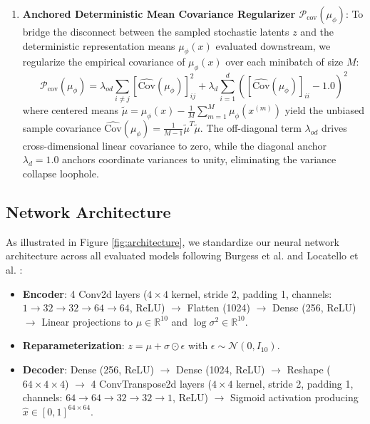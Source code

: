 \documentclass[11pt,a4paper]{article}
\begin{document}
\begin{enumerate}
    \item \textbf{Anchored Deterministic Mean Covariance Regularizer $\mathcal{P}_{\text{cov}}(\mu_\phi)$}:
    To bridge the disconnect between the sampled stochastic latents $z$ and the deterministic representation means $\mu_\phi(x)$ evaluated downstream, we regularize the empirical covariance of $\mu_\phi(x)$ over each minibatch of size $M$:
    \begin{equation}
    \mathcal{P}_{\text{cov}}(\mu_\phi) = \lambda_{od} \sum_{i \ne j} \left[ \widehat{\text{Cov}}(\mu_\phi) \right]_{ij}^2 + \lambda_d \sum_{i=1}^d \left( \left[ \widehat{\text{Cov}}(\mu_\phi) \right]_{ii} - 1.0 \right)^2
    \label{eq:cov_penalty}
    \end{equation}
    where centered means $\tilde{\mu} = \mu_\phi(x) - \frac{1}{M}\sum_{m=1}^M \mu_\phi(x^{(m)})$ yield the unbiased sample covariance $\widehat{\text{Cov}}(\mu_\phi) = \frac{1}{M-1}\tilde{\mu}^T \tilde{\mu}$.
    The off-diagonal term $\lambda_{od}$ drives cross-dimensional linear covariance to zero, while the diagonal anchor $\lambda_d = 1.0$ anchors coordinate variances to unity, eliminating the variance collapse loophole.
\end{enumerate}

\subsection{Network Architecture}
As illustrated in Figure \ref{fig:architecture}, we standardize our neural network architecture across all evaluated models following Burgess et al. \cite{burgess2018understanding} and Locatello et al. \cite{locatello2019challenging}:
\begin{itemize}
    \item \textbf{Encoder}: 4 Conv2d layers ($4\times 4$ kernel, stride 2, padding 1, channels: $1 \to 32 \to 32 \to 64 \to 64$, ReLU) $\to$ Flatten (1024) $\to$ Dense (256, ReLU) $\to$ Linear projections to $\mu \in \mathbb{R}^{10}$ and $\log\sigma^2 \in \mathbb{R}^{10}$.
    \item \textbf{Reparameterization}: $z = \mu + \sigma \odot \epsilon$ with $\epsilon \sim \mathcal{N}(0, I_{10})$.
    \item \textbf{Decoder}: Dense (256, ReLU) $\to$ Dense (1024, ReLU) $\to$ Reshape ($64 \times 4 \times 4$) $\to$ 4 ConvTranspose2d layers ($4\times 4$ kernel, stride 2, padding 1, channels: $64 \to 64 \to 32 \to 32 \to 1$, ReLU) $\to$ Sigmoid activation producing $\hat{x} \in [0, 1]^{64\times 64}$.
\end{itemize}
\end{document}
